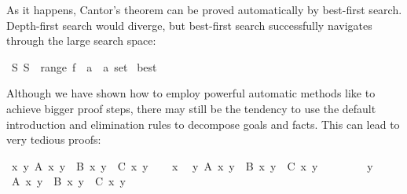 \begin{isabellebody}
\begin{isamarkuptext}
As it happens, Cantor's theorem can be proved automatically by best-first
search. Depth-first search would diverge, but best-first search successfully
navigates through the large search space:%
\end{isamarkuptext}%
\isamarkuptrue%
\isamarkupfalse%
\ {}{}S{}\ S\ {}\ range\ {}f\ {}{}\ {}a\ {}\ {}a\ set{}{}\isanewline
%
\isadelimproof
%
\endisadelimproof
%
\isatagproof
{}\isamarkupfalse%
\ best%
\endisatagproof
{\isafoldproof}%
%
\isadelimproof
%
\endisadelimproof
%
\isamarkuptrue%
%
\begin{isamarkuptext}%
Although we have shown how to employ powerful automatic methods like
 to achieve bigger proof steps, there may still be the
tendency to use the default introduction and elimination rules to
decompose goals and facts. This can lead to very tedious proofs:%
\end{isamarkuptext}%
\isamarkuptrue%
\isamarkupfalse%
\ {}{}x\ y{}\ A\ x\ y\ {}\ B\ x\ y\ {}\ C\ x\ y{}\isanewline
%
\isadelimproof
%
\endisadelimproof
%
\isatagproof
{}\isamarkupfalse%
\isanewline
\ \ \isamarkupfalse%
\ x\ \isamarkupfalse%
\ {}{}y{}\ A\ x\ y\ {}\ B\ x\ y\ {}\ C\ x\ y{}\isanewline
\ \ \isamarkupfalse%
\isanewline
\ \ \ \ \isamarkupfalse%
\ y\ \isamarkupfalse%
\ {}A\ x\ y\ {}\ B\ x\ y\ {}\ C\ x\ y{}\isanewline

\end{isabellebody}
